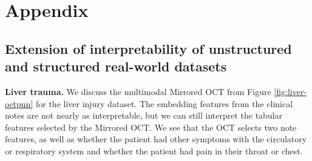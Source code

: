 \documentclass[10pt]{article} %
\begin{document}





\appendix
\section{Appendix}

\subsection{Extension of interpretability of unstructured and structured real-world datasets}\label{appendix:interpretability-continued}

\textbf{Liver trauma.} We discuss the multimodal Mirrored OCT from Figure \ref{fig:liver-octpnn} for the liver injury dataset. The embedding features from the clinical notes are not nearly as interpretable, but we can still interpret the tabular features selected by the Mirrored OCT. We see that the OCT selects two note features, as well as whether the patient had other symptoms with the circulatory or respiratory system and whether the patient had pain in their throat or chest.
\end{document}
